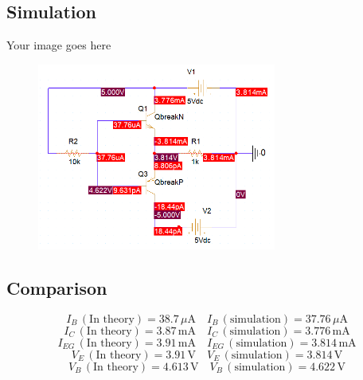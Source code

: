 \subsection{Simulation}
Your image goes here

\begin{figure}[h]
    \centering
    \includegraphics[width=0.7\textwidth]{graphics/ex7/f1.PNG}    
\end{figure}

\subsection{Comparison}





\[
I_B \, (\text{In theory}) = 38.7 \, \mu \text{A} \quad I_B \, (\text{simulation}) = 37.76 \, \mu \text{A}
\]
\[
I_C \, (\text{In theory}) = 3.87 \, \text{mA} \quad I_C \, (\text{simulation}) = 3.776 \, \text{mA}
\]
\[
I_{EG} \, (\text{In theory}) = 3.91 \, \text{mA} \quad I_{EG} \, (\text{simulation}) = 3.814 \, \text{mA}
\]
\[
V_E \, (\text{In theory}) = 3.91 \, \text{V} \quad V_E \, (\text{simulation}) = 3.814 \, \text{V}
\]
\[
V_B \, (\text{In theory}) = 4.613 \, \text{V} \quad V_B \, (\text{simulation}) = 4.622 \, \text{V}
\]
